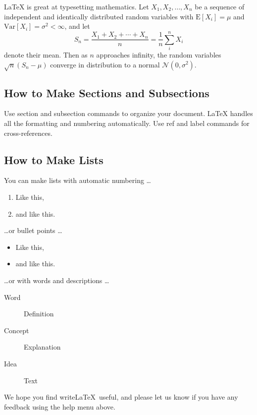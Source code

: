 \documentclass[a4paper]{article}
\begin{document}
\LaTeX{} is great at typesetting mathematics. Let $X_1, X_2, \ldots, X_n$ be a sequence of independent and identically distributed random variables with $\text{E}[X_i] = \mu$ and $\text{Var}[X_i] = \sigma^2 < \infty$, and let
$$S_n = \frac{X_1 + X_2 + \cdots + X_n}{n}
      = \frac{1}{n}\sum_{i}^{n} X_i$$
denote their mean. Then as $n$ approaches infinity, the random variables $\sqrt{n}(S_n - \mu)$ converge in distribution to a normal $\mathcal{N}(0, \sigma^2)$.

\subsection{How to Make Sections and Subsections}

Use section and subsection commands to organize your document. \LaTeX{} handles all the formatting and numbering automatically. Use ref and label commands for cross-references.

\subsection{How to Make Lists}

You can make lists with automatic numbering \dots

\begin{enumerate}
\item Like this,
\item and like this.
\end{enumerate}
\dots or bullet points \dots
\begin{itemize}
\item Like this,
\item and like this.
\end{itemize}
\dots or with words and descriptions \dots
\begin{description}
\item[Word] Definition
\item[Concept] Explanation
\item[Idea] Text
\end{description}

We hope you find write\LaTeX\ useful, and please let us know if you have any feedback using the help menu above.
\end{document}
